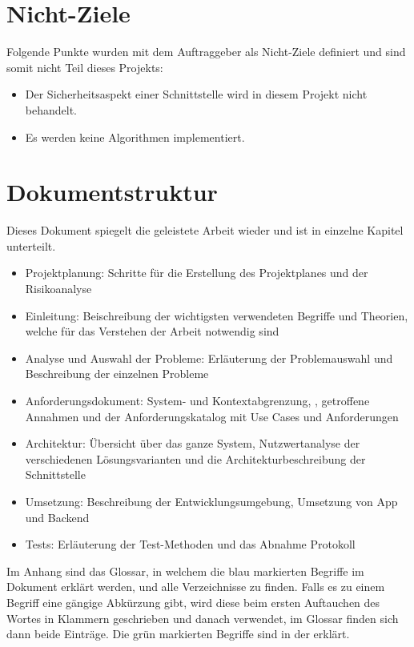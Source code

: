 \section{Nicht-Ziele}\label{nicht_ziele}
Folgende Punkte wurden mit dem Auftraggeber als Nicht-Ziele definiert und sind somit nicht Teil dieses Projekts:
\begin{itemize}
\item Der Sicherheitsaspekt einer Schnittstelle wird in diesem Projekt nicht behandelt.
\item Es werden keine Algorithmen implementiert.
\end{itemize}

\section{Dokumentstruktur}\label{document_structure}
Dieses Dokument spiegelt die geleistete Arbeit wieder und ist in einzelne Kapitel unterteilt.
\begin{itemize}
\item Projektplanung: Schritte für die Erstellung des Projektplanes und der Risikoanalyse
\item Einleitung: Beischreibung der wichtigsten verwendeten Begriffe und Theorien, welche für das Verstehen der Arbeit notwendig sind
\item Analyse und Auswahl der Probleme: Erläuterung der Problemauswahl und Beschreibung der einzelnen Probleme
\item Anforderungsdokument: System- und Kontextabgrenzung, , getroffene Annahmen und der Anforderungskatalog mit Use Cases und Anforderungen
\item Architektur: Übersicht über das ganze System, Nutzwertanalyse der verschiedenen Lösungsvarianten und die Architekturbeschreibung der Schnittstelle
\item Umsetzung: Beschreibung der Entwicklungsumgebung, Umsetzung von App und Backend
\item Tests: Erläuterung der Test-Methoden und das Abnahme Protokoll
\end{itemize}

Im Anhang sind das Glossar, in welchem die blau markierten Begriffe im Dokument erklärt werden, und alle Verzeichnisse zu finden. Falls es zu einem Begriff eine gängige Abkürzung gibt, wird diese beim ersten Auftauchen des Wortes in Klammern geschrieben und danach verwendet, im Glossar finden sich dann beide Einträge. Die grün markierten Begriffe sind in der  erklärt.